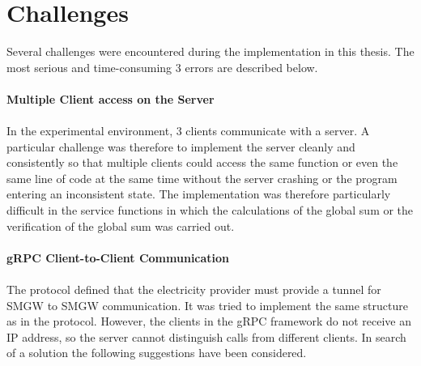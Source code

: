 
\section{Challenges}
Several challenges were encountered during the implementation in this thesis. The most serious and time-consuming 3 errors are described below.\\
\\
\textbf{Multiple Client access on the Server}
\\
\\ 
In the experimental environment, 3 clients communicate with a server. A particular challenge was therefore to implement the server cleanly and consistently so that multiple clients could access the same function or even the same line of code  at the same time without the server crashing or the program entering an inconsistent state. The implementation was therefore particularly difficult in the service functions in which the calculations of the global sum or the verification of the global sum was carried out.%
\\
\\
\textbf{gRPC Client-to-Client Communication}
\\
\\
The protocol defined that the electricity provider must provide a tunnel for SMGW to SMGW communication. It was tried to implement the same structure as in the protocol. However, the clients in the gRPC framework do not receive an IP address, so the server cannot distinguish calls from different clients. In search of a solution the following suggestions have been considered. 

